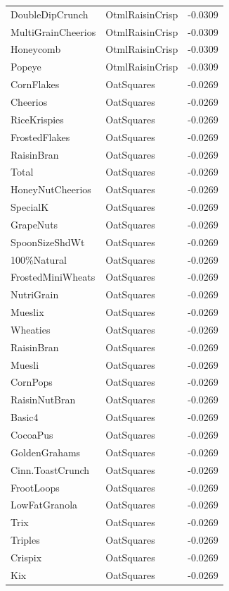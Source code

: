 \begin{table}[!htbp]
\begin{tabular}{lll}
\\
DoubleDipCrunch & OtmlRaisinCrisp & -0.0309
\\
MultiGrainCheerios & OtmlRaisinCrisp & -0.0309
\\
Honeycomb & OtmlRaisinCrisp & -0.0309
\\
Popeye & OtmlRaisinCrisp & -0.0309
\\
CornFlakes & OatSquares & -0.0269
\\
Cheerios & OatSquares & -0.0269
\\
RiceKrispies & OatSquares & -0.0269
\\
FrostedFlakes & OatSquares & -0.0269
\\
RaisinBran & OatSquares & -0.0269
\\
Total & OatSquares & -0.0269
\\
HoneyNutCheerios & OatSquares & -0.0269
\\
SpecialK & OatSquares & -0.0269
\\
GrapeNuts & OatSquares & -0.0269
\\
SpoonSizeShdWt & OatSquares & -0.0269
\\
100\%Natural & OatSquares & -0.0269
\\
FrostedMiniWheats & OatSquares & -0.0269
\\
NutriGrain & OatSquares & -0.0269
\\
Mueslix & OatSquares & -0.0269
\\
Wheaties & OatSquares & -0.0269
\\
RaisinBran & OatSquares & -0.0269
\\
Muesli & OatSquares & -0.0269
\\
CornPops & OatSquares & -0.0269
\\
RaisinNutBran & OatSquares & -0.0269
\\
Basic4 & OatSquares & -0.0269
\\
CocoaPus & OatSquares & -0.0269
\\
GoldenGrahams & OatSquares & -0.0269
\\
Cinn.ToastCrunch & OatSquares & -0.0269
\\
FrootLoops & OatSquares & -0.0269
\\
LowFatGranola & OatSquares & -0.0269
\\
Trix & OatSquares & -0.0269
\\
Triples & OatSquares & -0.0269
\\
Crispix & OatSquares & -0.0269
\\
Kix & OatSquares & -0.0269
\\

\end{tabular}
\end{table}
